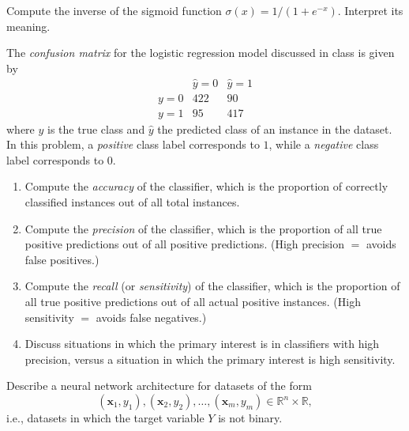 \documentclass[12pt,reqno]{amsart}
\begin{document}
\vfill
\prob Compute the inverse of the sigmoid function $\sigma(x) = 1/(1+e^{-x})$. Interpret its meaning.













\vfill
\newpage
\prob The \textit{confusion matrix} for the logistic regression model discussed in class is given by
	\[\begin{array}{c|cc}
	& \hat{y}=0 & \hat{y} = 1 \\ \hline
	y=0 & 422 & 90 \\
	y=1 & 95 & 417
	\end{array}
	\]
where $y$ is the true class and $\hat{y}$ the predicted class of an instance in the dataset. In this problem, a \textit{positive} class label corresponds to $1$, while a \textit{negative} class label corresponds to $0$.

\medskip
\begin{enumerate}
\item Compute the \textit{accuracy} of the classifier, which is the proportion of correctly classified instances out of all total instances.\vfill
\item Compute the \textit{precision} of the classifier, which is the proportion of all true positive predictions out of all positive predictions. (High precision $=$ avoids false positives.)\vfill
\item Compute the \textit{recall} (or \textit{sensitivity}) of the classifier, which is the proportion of all true positive predictions out of all actual positive instances. (High sensitivity $=$ avoids false negatives.)\vfill
\item Discuss situations in which the primary interest is in classifiers with high precision, versus a situation in which the primary interest is high sensitivity.
\end{enumerate}







\vfill
\prob Describe a neural network architecture for datasets of the form
	\[(\mathbf{x}_1,y_1),(\mathbf{x}_2,y_2),\ldots,(\mathbf{x}_m,y_m) \in \mathbb{R}^n \times \mathbb{R},
	\]
i.e., datasets in which the target variable $Y$ is not binary.

\vfill
\end{document}
